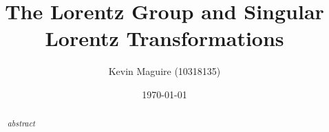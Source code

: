 \documentclass[floatfix,aps,prd,amsmath,amssymb]{revtex4}
\begin{document}
\title{The Lorentz Group and Singular Lorentz Transformations}
\author{Kevin Maguire (10318135)}
\date{\today}

\begin{abstract}
\textit{abstract}
\end{abstract}

\maketitle
{}


\newpage

\tableofcontents

\newpage









 






\begin{thebibliography}{10}
\end{thebibliography}
\end{document}
